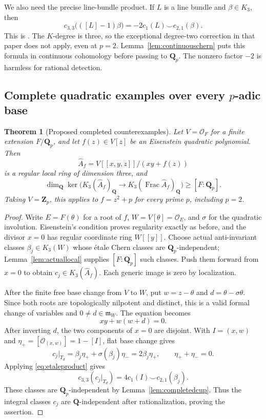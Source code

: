 \documentclass[11pt,a4paper]{article}
\newtheorem{theorem}{Theorem}[section]
\theoremstyle{remark}
\newcommand{\Q}{\mathbf Q}
\newcommand{\Z}{\mathbf Z}
\newcommand{\OO}{\mathcal O}
\newcommand{\Frac}{\operatorname{Frac}}
\begin{document}
We also need the precise line-bundle product. If $L$ is a line bundle and $\beta\in K_3$, then
\begin{equation}\label{eq:etaleproduct}
c_{3,3}\bigl(([L]-1)\beta\bigr)
=-2c_1(L)\smile c_{2,1}(\beta).
\end{equation}
This is \cite[Theorem~3.11(i)]{WeibelChern}. The $K$-degree is three, so the exceptional degree-two correction in that paper does not apply, even at $p=2$. Lemma~\ref{lem:continuouschern} puts this formula in continuous cohomology before passing to $\Q_p$. The nonzero factor $-2$ is harmless for rational detection.

\subsection{Complete quadratic examples over every $p$-adic base}

\begin{theorem}[Proposed completed counterexamples]\label{thm:completed}
Let $V=\OO_F$ for a finite extension $F/\Q_p$, and let $f(z)\in V[z]$ be an Eisenstein quadratic polynomial. Then
\[
\widehat A_f=V[[x,y,z]]/(xy+f(z))
\]
is a regular local ring of dimension three, and
\[
\dim_{\Q}\ker\bigl(K_3(\widehat A_f)_{\Q}
\longrightarrow K_3(\Frac\widehat A_f)_{\Q}\bigr)\geq[F:\Q_p].
\]
Taking $V=\Z_p$, this applies to $f=z^2+p$ for every prime $p$, including $p=2$.
\end{theorem}
\begin{proof}
Write $E=F(\theta)$ for a root of $f$, $W=V[\theta]=\OO_E$, and $\sigma$ for the quadratic involution. Eisenstein's condition proves regularity exactly as before, and the divisor $x=0$ has regular coordinate ring $W[[y]]$. Choose actual anti-invariant classes $\beta_j\in K_3(W)$ whose \'etale Chern classes are $\Q_p$-independent; Lemma~\ref{lem:actuallocal} supplies $[F:\Q_p]$ such classes. Push them forward from $x=0$ to obtain $c_j\in K_3(\widehat A_f)$. Each generic image is zero by localization.

After the finite free base change from $V$ to $W$, put $w=z-\theta$ and $d=\theta-\sigma\theta$. Since both roots are topologically nilpotent and distinct, this is a valid formal change of variables and $0\ne d\in\mathfrak m_W$. The equation becomes
\[
xy+w(w+d)=0.
\]
After inverting $d$, the two components of $x=0$ are disjoint. With $I=(x,w)$ and $\eta_+=[\OO_{(x,w)}]=1-[I]$, flat base change gives
\[
c_j|_{T_d}=\beta_j\eta_++\sigma(\beta_j)\eta_-
=2\beta_j\eta_+,
\qquad \eta_++\eta_-=0.
\]
Applying \eqref{eq:etaleproduct} gives
\[
c_{3,3}(c_j|_{T_d})=4c_1(I)\smile c_{2,1}(\beta_j).
\]
These classes are $\Q_p$-independent by Lemma~\ref{lem:completedcup}. Thus the integral classes $c_j$ are $\Q$-independent after rationalization, proving the assertion.
\end{proof}
\end{document}
